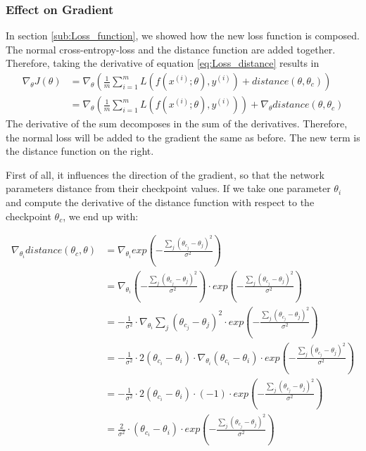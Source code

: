 \subsubsection{Effect on Gradient}\label{sub:Effect_on_Gradient} 
In section \ref{sub:Loss_function}, we showed how the new loss function is
composed. The normal cross-entropy-loss and the distance function are added
together. Therefore, taking the derivative of equation \ref{eq:Loss_distance}
results in 
\begin{align}
    \nabla_\theta J(\theta) 
    &= \nabla_\theta (\frac{1}{m} \sum_{i=1}^m L(f(x^{(i)}; \theta), y^{(i)}) + distance(\theta, \theta_c))\\
    &= \nabla_\theta (\frac{1}{m} \sum_{i=1}^m L(f(x^{(i)}; \theta), y^{(i)})) + \nabla_\theta distance(\theta, \theta_c)
\end{align}
The derivative of the sum decomposes in the sum of the derivatives. Therefore,
the normal loss will be added to the gradient the same as before. The new
term is the distance function on the right.

First of all, it influences the direction of the gradient, so that the network
parameters distance from their checkpoint values. If we take one parameter
$\theta_i$ and compute the derivative of the distance function with respect to
the checkpoint $\theta_c$, we end up with:

\begin{align}
    \nabla_{\theta_i} distance(\theta_c, \theta)
    &= \nabla_{\theta_i} exp(-\frac{\sum_j (\theta_{c_j}-\theta_{j})^2}{\sigma^2}) \\
    &= \nabla_{\theta_i} (-\frac{\sum_j (\theta_{c_j}-\theta_{j})^2}{\sigma^2}) \cdot exp(-\frac{\sum_j (\theta_{c_j}-\theta_{j})^2}{\sigma^2}) \\
    &= -\frac{1}{\sigma^2} \cdot \nabla_{\theta_i} \sum_j (\theta_{c_j}-\theta_{j})^2 \cdot exp(-\frac{\sum_j (\theta_{c_j}-\theta_{j})^2}{\sigma^2}) \\
    &= -\frac{1}{\sigma^2} \cdot 2 (\theta_{c_i} - \theta_i) \cdot \nabla_{\theta_i}(\theta_{c_i} - \theta_i) \cdot exp(-\frac{\sum_j (\theta_{c_j}-\theta_{j})^2}{\sigma^2}) \\
    &= -\frac{1}{\sigma^2} \cdot 2 (\theta_{c_i} - \theta_i) \cdot (-1) \cdot exp(-\frac{\sum_j (\theta_{c_j}-\theta_{j})^2}{\sigma^2}) \\
    &= \frac{2}{\sigma^2} \cdot (\theta_{c_i} - \theta_i) \cdot exp(-\frac{\sum_j (\theta_{c_j}-\theta_{j})^2}{\sigma^2}) 
\end{align}


